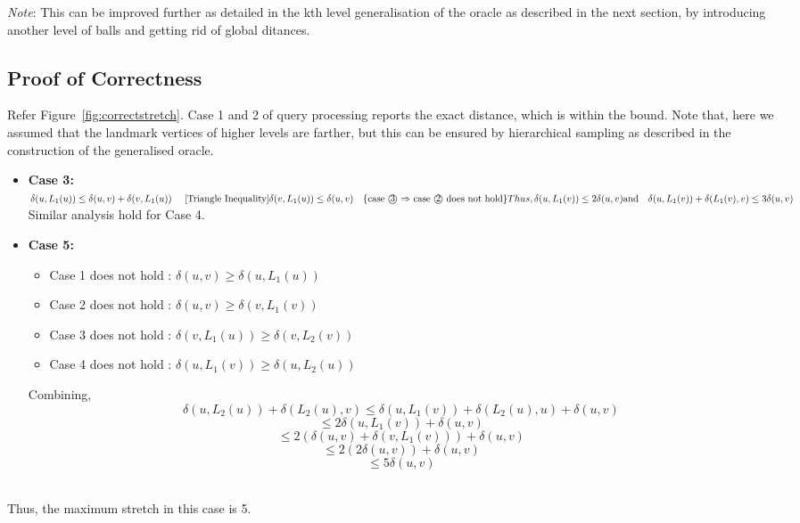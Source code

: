 \documentclass{article}
\begin{document}
\noindent \emph{Note}: This can be improved further as detailed in the kth level generalisation of the oracle as described in the next section, by introducing another level of balls and getting rid of global ditances.
\subsection{Proof of Correctness}
Refer Figure~\ref{fig:correctstretch}. Case 1 and 2 of query processing reports the exact distance, which is within the bound. Note that, here we assumed that the landmark vertices of higher levels are farther, but this can be ensured by hierarchical sampling as described in the construction of the generalised oracle.
\begin{itemize}
    \item \textbf{Case 3:} \(\delta(u, L_1(u)) \leq \delta(u, v) + \delta(v, L_1(u))\quad \text{ [Triangle Inequality]}\\
    \delta(v, L_1(u)) \leq \delta(u, v) \quad \text{\{case \textcircled{3} $\Rightarrow$ case \textcircled{2} does not hold\}} \\
    Thus,  \delta(u, L_1(v)) \leq 2\delta(u, v) \\
    \text{and} \quad \delta(u, L_1(v)) + \delta(L_1(v), v) \leq 3\delta(u, v)\) \\
    Similar analysis hold for Case 4. 
    \item \textbf{Case 5:} 
\begin{itemize}
    \item Case 1 does not hold : $\delta(u,v) \geq \delta(u, L_1(u))$
    \item Case 2 does not hold : $\delta(u,v) \geq \delta(v, L_1(v))$
    \item Case 3 does not hold : $\delta(v, L_1(u)) \geq \delta(v, L_2(v))$
    \item Case 4 does not hold : $\delta(u, L_1(v)) \geq \delta(u, L_2(u))$
\end{itemize}

Combining,\[
\delta(u, L_2(u)) + \delta(L_2(u), v) 
\leq \delta(u, L_1(v)) + \delta(L_2(u), u) + \delta(u, v) \] 
\[\leq 2\delta(u, L_1(v)) + \delta(u, v) \]
\[\leq 2(\delta(u,v) + \delta(v, L_1(v))) + \delta(u, v)\] 
\[\leq 2(2\delta(u,v)) + \delta(u, v)\]
\[\leq 5\delta(u, v)\]\\
\end{itemize} 
Thus, the maximum stretch in this case is 5. 
\end{document}
